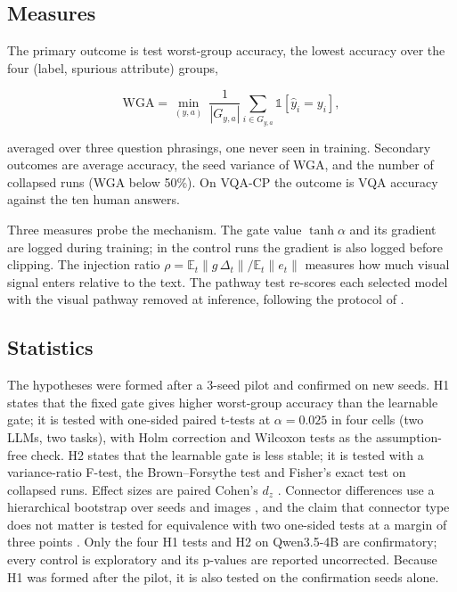 \subsection{Measures}

The primary outcome is test worst-group accuracy, the lowest accuracy over the four (label, spurious attribute)
groups,

\[
\mathrm{WGA} = \min_{(y,a)} \ \frac{1}{|G_{y,a}|} \sum_{i \in G_{y,a}} \mathbb{1}[\hat y_i = y_i],
\]

averaged over three question phrasings, one never seen in training. Secondary outcomes are average accuracy, the
seed variance of WGA, and the number of collapsed runs (WGA below 50\%). On VQA-CP the outcome is VQA accuracy
against the ten human answers.

Three measures probe the mechanism. The gate value \(\tanh\alpha\) and its gradient are logged during training; in the
control runs the gradient is also logged before clipping. The injection ratio \(\rho = \mathbb{E}_t\|g\,\Delta_t\| / \mathbb{E}_t\|e_t\|\) measures how much visual signal
enters relative to the text. The pathway test re-scores each selected model with the visual pathway removed at
inference, following the protocol of \citep{farazi2026gate}.

\subsection{Statistics}

The hypotheses were formed after a 3-seed pilot and confirmed on new seeds. H1 states that the fixed gate gives
higher worst-group accuracy than the learnable gate; it is tested with one-sided paired t-tests at
\(\alpha = 0.025\) in four cells (two LLMs, two tasks), with Holm correction \citep{holm1979simple} and Wilcoxon tests as the
assumption-free check. H2 states that the learnable gate is less stable; it is tested with a variance-ratio F-test,
the Brown--Forsythe test and Fisher's exact test on collapsed runs. Effect sizes are paired Cohen's \(d_z\)
\citep{cohen1988power}. Connector differences use a hierarchical bootstrap over seeds and images \citep{efron1993bootstrap}, and
the claim that connector type does not matter is tested for equivalence with two one-sided tests at a margin of
three points \citep{schuirmann1987tost}. Only the four H1 tests and H2 on Qwen3.5-4B are confirmatory; every control is
exploratory and its p-values are reported uncorrected. Because H1 was formed after the pilot, it is also tested on
the confirmation seeds alone.


